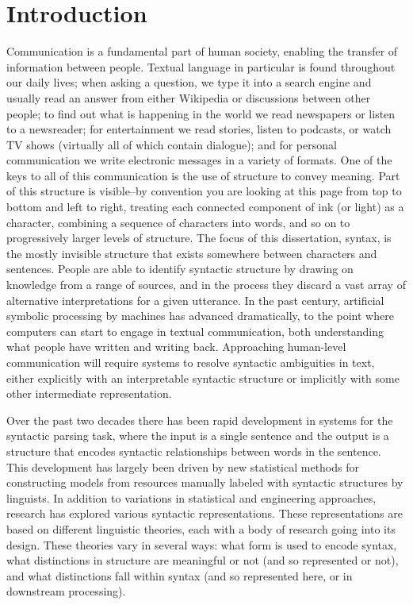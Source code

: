 \chapter{Introduction}

Communication is a fundamental part of human society, enabling the transfer of information between people.
Textual language in particular is found throughout our daily lives;
when asking a question, we type it into a search engine and usually read an answer from either Wikipedia or discussions between other people;
to find out what is happening in the world we read newspapers or listen to a newsreader;
for entertainment we read stories, listen to podcasts, or watch TV shows (virtually all of which contain dialogue);
and for personal communication we write electronic messages in a variety of formats.
One of the keys to all of this communication is the use of structure to convey meaning.
Part of this structure is visible--by convention you are looking at this page from top to bottom and left to right, treating each connected component of ink (or light) as a character, combining a sequence of characters into words, and so on to progressively larger levels of structure.
The focus of this dissertation, syntax, is the mostly invisible structure that exists somewhere between characters and sentences.
People are able to identify syntactic structure by drawing on knowledge from a range of sources, and in the process they discard a vast array of alternative interpretations for a given utterance.
In the past century, artificial symbolic processing by machines has advanced dramatically, to the point where computers can start to engage in textual communication, both understanding what people have written and writing back.
Approaching human-level communication will require systems to resolve syntactic ambiguities in text, either explicitly with an interpretable syntactic structure or implicitly with some other intermediate representation.

Over the past two decades there has been rapid development in systems for the syntactic parsing task, where the input is a single sentence and the output is a structure that encodes syntactic relationships between words in the sentence.
This development has largely been driven by new statistical methods for constructing models from resources manually labeled with syntactic structures by linguists.
In addition to variations in statistical and engineering approaches, research has explored various syntactic representations.
These representations are based on different linguistic theories, each with a body of research going into its design.
These theories vary in several ways: what form is used to encode syntax, what distinctions in structure are meaningful or not (and so represented or not), and what distinctions fall within syntax (and so represented here, or in downstream processing).

